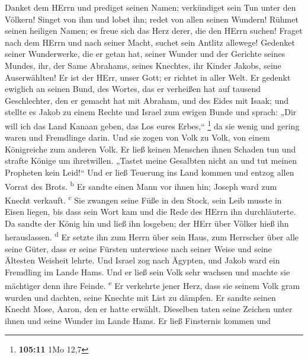  Danket dem HErrn und prediget seinen Namen; verkündiget
sein Tun unter den Völkern!  Singet von ihm und lobet ihn;
redet von allen seinen Wundern!  Rühmet seinen heiligen
Namen; es freue sich das Herz derer, die den HErrn suchen!
 Fraget nach dem HErrn und nach seiner Macht, suchet sein
Antlitz allewege!  Gedenket seiner Wunderwerke, die er
getan hat, seiner Wunder und der Gerichte seines Mundes, 
ihr, der Same Abrahams, seines Knechtes, ihr Kinder Jakobs, seine
Auserwählten!  Er ist der HErr, unser Gott; er richtet in
aller Welt.  Er gedenkt ewiglich an seinen Bund, des
Wortes, das er verheißen hat auf tausend Geschlechter, 
den er gemacht hat mit Abraham, und des Eides mit Isaak; 
und stellte es Jakob zu einem Rechte und Israel zum ewigen Bunde
 und sprach: „Dir will ich das Land Kanaan geben, das Los
eures Erbes,`` \footnote{\textbf{105:11} 1Mo 12,7}  da
sie wenig und gering waren und Fremdlinge darin.  Und sie
zogen von Volk zu Volk, von einem Königreiche zum anderen Volk.
 Er ließ keinen Menschen ihnen Schaden tun und strafte
Könige um ihretwillen.  „Tastet meine Gesalbten nicht an
und tut meinen Propheten kein Leid!{}``  Und er ließ
Teuerung ins Land kommen und entzog allen Vorrat des Brots.
\textsuperscript{b}  Er sandte einen Mann vor ihnen hin;
Joseph ward zum Knecht verkauft. \textsuperscript{c}  Sie
zwangen seine Füße in den Stock, sein Leib musste in Eisen liegen,
 bis dass sein Wort kam und die Rede des HErrn ihn
durchläuterte.  Da sandte der König hin und ließ ihn
losgeben; der HErr über Völker hieß ihn herauslassen.
\textsuperscript{d}  Er setzte ihn zum Herrn über sein
Haus, zum Herrscher über alle seine Güter,  dass er seine
Fürsten unterwiese nach seiner Weise und seine Ältesten Weisheit lehrte.
 Und Israel zog nach Ägypten, und Jakob ward ein
Fremdling im Lande Hams.  Und er ließ sein Volk sehr
wachsen und machte sie mächtiger denn ihre Feinde. \textsuperscript{e}
 Er verkehrte jener Herz, dass sie seinem Volk gram
wurden und dachten, seine Knechte mit List zu dämpfen. 
Er sandte seinen Knecht Mose, Aaron, den er hatte erwählt.
 Dieselben taten seine Zeichen unter ihnen und seine
Wunder im Lande Hams.  Er ließ Finsternis kommen und

